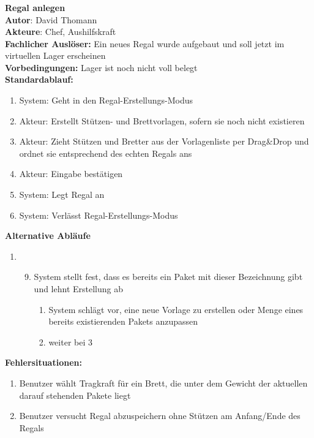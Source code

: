 \subsubsection*{}
\textbf{Regal anlegen}\bigskip\\
\textbf{Autor}: David Thomann\\
\textbf{Akteure}: Chef, Aushilfskraft\\
\textbf{Fachlicher Auslöser:} Ein neues Regal wurde aufgebaut und soll jetzt im virtuellen Lager erscheinen\\
\textbf{Vorbedingungen: }Lager ist noch nicht voll belegt\\
\textbf{Standardablauf:}
\begin{enumerate}
    \item System: Geht in den Regal-Erstellungs-Modus
    \item Akteur: Erstellt Stützen- und Brettvorlagen, sofern sie noch nicht existieren
    \item Akteur: Zieht Stützen und Bretter aus der Vorlagenliste per Drag\&Drop und ordnet sie entsprechend des echten Regals ans
    \item Akteur: Eingabe bestätigen
    \item System: Legt Regal an
    \item System: Verlässt Regal-Erstellungs-Modus
\end{enumerate}
\textbf{Alternative Abläufe}
\begin{enumerate}
    \item[] \begin{enumerate}\setcounter{enumi}{8}
\item System stellt fest, dass es bereits ein Paket mit dieser Bezeichnung gibt und lehnt Erstellung ab
    \begin{enumerate}
    \item System schlägt vor, eine neue Vorlage zu erstellen oder Menge eines bereits existierenden Pakets anzupassen
    \item weiter bei 3
\end{enumerate}
\end{enumerate}
\end{enumerate}
\textbf{Fehlersituationen:}
\begin{enumerate}
    \item Benutzer wählt Tragkraft für ein Brett, die unter dem Gewicht der aktuellen darauf stehenden Pakete liegt
    \item Benutzer versucht Regal abzuspeichern ohne Stützen am Anfang/Ende des Regals
\end{enumerate}

